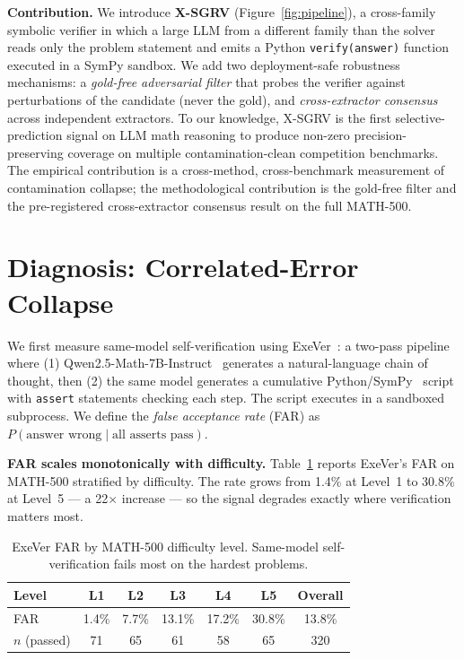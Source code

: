 \documentclass{article}
\begin{document}
\textbf{Contribution.} We introduce \textbf{X-SGRV} (Figure~\ref{fig:pipeline}), a cross-family symbolic verifier in which a large LLM from a different family than the solver reads only the problem statement and emits a Python \texttt{verify(answer)} function executed in a SymPy sandbox. We add two deployment-safe robustness mechanisms: a \emph{gold-free adversarial filter} that probes the verifier against perturbations of the candidate (never the gold), and \emph{cross-extractor consensus} across independent extractors. To our knowledge, X-SGRV is the first selective-prediction signal on LLM math reasoning to produce non-zero precision-preserving coverage on multiple contamination-clean competition benchmarks. The empirical contribution is a cross-method, cross-benchmark measurement of contamination collapse; the methodological contribution is the gold-free filter and the pre-registered cross-extractor consensus result on the full MATH-500.

\section{Diagnosis: Correlated-Error Collapse}
\label{sec:collapse}

We first measure same-model self-verification using ExeVer~\citep{exever}: a two-pass pipeline where (1) Qwen2.5-Math-7B-Instruct~\citep{yang2024qwen25math} generates a natural-language chain of thought, then (2) the same model generates a cumulative Python/SymPy~\citep{meurer2017sympy} script with \texttt{assert} statements checking each step. The script executes in a sandboxed subprocess. We define the \emph{false acceptance rate} (FAR) as $P(\text{answer wrong} \mid \text{all asserts pass})$.

\textbf{FAR scales monotonically with difficulty.} Table~\ref{tab:collapse} reports ExeVer's FAR on MATH-500 stratified by difficulty. The rate grows from 1.4\% at Level~1 to 30.8\% at Level~5 --- a 22$\times$ increase --- so the signal degrades exactly where verification matters most.

\begin{table}[t]
\centering
\caption{ExeVer FAR by MATH-500 difficulty level. Same-model self-verification fails most on the hardest problems.}
\label{tab:collapse}
\small
\setlength{\tabcolsep}{3pt}
\begin{tabular}{lcccccc}
\toprule
Level & L1 & L2 & L3 & L4 & L5 & Overall \\
\midrule
FAR & 1.4\% & 7.7\% & 13.1\% & 17.2\% & 30.8\% & 13.8\% \\
$n$ (passed) & 71 & 65 & 61 & 58 & 65 & 320 \\
\bottomrule
\end{tabular}
\end{table}
\end{document}
